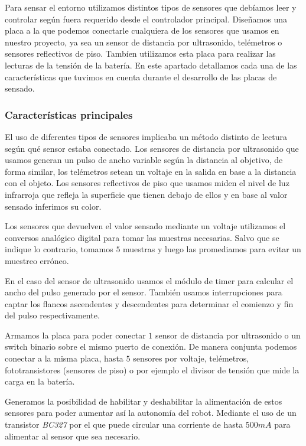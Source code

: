 Para sensar el entorno utilizamos distintos tipos de sensores que deb\'iamos leer y controlar seg\'un fuera
requerido desde el controlador principal.
Dise\~namos una placa a la que podemos conectarle cualquiera de los sensores que usamos en nuestro proyecto,
ya sea un sensor de distancia por ultrasonido, tel\'emetros o sensores reflectivos de piso.
Tamb\'ien utilizamos esta placa para realizar las lecturas de la tensi\'on de la bater\'ia.
En este apartado detallamos cada una de las caracter\'isticas que tuvimos en cuenta durante el desarrollo
de las placas de sensado.

\subsubsection{Caracter\'isticas principales}
\label{h_placas_sensado_caracteristicas}

El uso de diferentes tipos de sensores implicaba un m\'etodo distinto de lectura seg\'un qu\'e sensor
estaba conectado.
Los sensores de distancia por ultrasonido que usamos generan un pulso de ancho variable seg\'un la
distancia al objetivo, de forma similar, los tel\'emetros setean un voltaje en la salida en base a la
distancia con el objeto.
Los sensores reflectivos de piso que usamos miden el nivel de luz infrarroja que refleja la superficie
que tienen debajo de ellos y en base al valor sensado inferimos su color.

Los sensores que devuelven el valor sensado mediante un voltaje utilizamos el conversos anal\'ogico
digital para tomar las muestras necesarias.
Salvo que se indique lo contrario, tomamos $5$ muestras y luego las promediamos para evitar un muestreo
err\'oneo.

En el caso del sensor de ultrasonido usamos el m\'odulo de timer para calcular el ancho del pulso
generado por el sensor.
Tambi\'en usamos interrupciones para captar los flancos ascendentes y descendentes para determinar el
comienzo y fin del pulso respectivamente.

Armamos la placa para poder conectar $1$ sensor de distancia por ultrasonido o un switch binario sobre
el mismo puerto de conexi\'on.
De manera conjunta podemos conectar a la misma placa, hasta $5$ sensores por voltaje, tel\'emetros,
fototransistores (sensores de piso) o por ejemplo el divisor de tensi\'on que mide la carga en la bater\'ia.

Generamos la posibilidad de habilitar y deshabilitar la alimentaci\'on de estos sensores para poder aumentar
as\'i la autonom\'ia del robot.
Mediante el uso de un transistor \emph{BC327} por el que puede circular una corriente de hasta $500mA$ para
alimentar al sensor que sea necesario.

